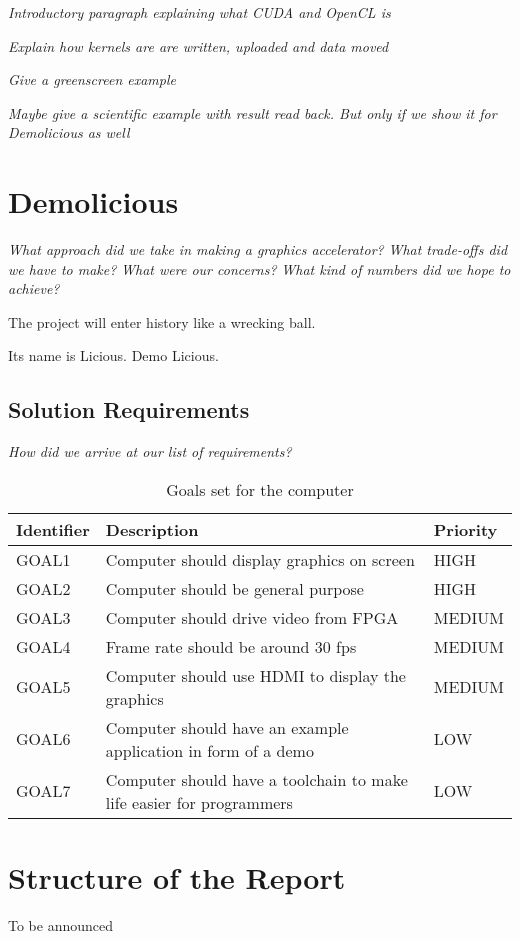 \documentclass[../main/report.tex]{subfiles}
\begin{document}
\emph{Introductory paragraph explaining what CUDA and OpenCL is}

\emph{Explain how kernels are are written, uploaded and data moved}

\emph{Give a greenscreen example}

\emph{Maybe give a scientific example with result read back. But only if we show it for Demolicious as well}


\section{Demolicious}

\textit{What approach did we take in making a graphics accelerator?}
\textit{What trade-offs did we have to make?}
\textit{What were our concerns?}
\textit{What kind of numbers did we hope to achieve?}

The project will enter history like a wrecking ball.

Its name is Licious. Demo Licious.

\subsection{Solution Requirements}

\textit{How did we arrive at our list of requirements?}

\begin{table}[htp]
    \centering
    \begin{tabular}{|l|p{8cm}|l|}
        \hline
        \textbf{Identifier}           & \textbf{Description}                & \textbf{Priority} \\ \hline
        GOAL1  & Computer should display graphics on screen                           & HIGH    \\ \hline
        GOAL2  & Computer should be general purpose                                   & HIGH    \\ \hline
        GOAL3  & Computer should drive video from FPGA                                & MEDIUM  \\ \hline
        GOAL4  & Frame rate should be around 30 fps                                   & MEDIUM  \\ \hline
        GOAL5  & Computer should use HDMI to display the graphics                     & MEDIUM  \\ \hline
        GOAL6  & Computer should have an example application in form of a demo        & LOW     \\ \hline
        GOAL7  & Computer should have a toolchain to make life easier for programmers & LOW     \\ \hline
    \end{tabular}
    \caption{Goals set for the computer}
    \label{tab:goals}
\end{table}

\newpage
\section{Structure of the Report}

To be announced
\end{document}
